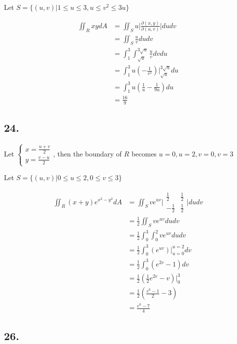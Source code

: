 \documentclass{article}
\begin{document}
  Let $S = \{ (u, v) | 1 \leq u \leq 3, u \leq v^2 \leq 3u \}$

  $$\begin{aligned}
    \iint_R xy dA &= \iint_S u \biggl| \frac{\partial (x, y)}{\partial (u, v)} \biggl| du dv \\
    &= \iint_S \frac{u}{v} du dv \\
    &= \int_1^3 \int_{\sqrt u}^{3\sqrt u} \frac u v dv du \\
    &= \int_1^3 u (-\frac{1}{v^2})\biggl|_{\sqrt u}^{3\sqrt u} du \\
    &= \int_1^3 u (\frac{1}{u} - \frac{1}{9u}) du \\
    &= \frac{16}{9}
  \end{aligned}$$

  \subsection*{24. }

  Let $\left\{ \begin{array}{ll} x = \frac{u + v}{2} \\ y = \frac{v - u}{2} \end{array}\right.$, then the boundary of $R$ becomes $u = 0, u = 2, v = 0, v = 3$

  Let $S = \{ (u, v) | 0 \leq u \leq 2, 0 \leq v \leq 3 \}$

  $$\begin{aligned}
    \iint_R (x+y)e^{x^2-y^2} dA &= \iint_S v e^{uv} \biggl| \begin{matrix}
      \frac 1 2 & \frac 1 2 \\
      -\frac 1 2 & \frac 1 2
    \end{matrix} \biggl| du dv \\
    &= \frac 1 2 \iint_S ve^{uv} du dv \\
    &= \frac 1 2 \int_0^3 \int_0^2 ve^{uv} du dv \\
    &= \frac 1 2 \int_0^3 (e^{uv})\biggl|_{u=0}^{u=2} dv \\
    &= \frac 1 2 \int_0^3 (e^{2v} - 1) dv \\
    &= \frac 1 2 (\frac 1 2 e^{2v} - v)\biggl|_0^3 \\
    &= \frac 1 2 (\frac{e^6 - 1}{2} - 3) \\
    &= \frac{e^6 - 7}{4}
  \end{aligned}$$

  \subsection*{26. }
\end{document}
